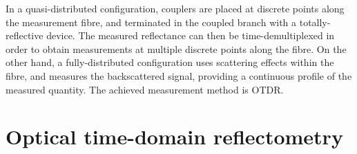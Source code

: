 \documentclass{standalone}
\begin{document}
In a quasi-distributed configuration, couplers are placed at discrete points along the measurement fibre, and terminated in the coupled branch with a totally-reflective device. The measured reflectance can then be time-demultiplexed in order to obtain measurements at multiple discrete points along the fibre. On the other hand, a fully-distributed configuration uses scattering effects within the fibre, and measures the backscattered signal, providing a continuous profile of the measured quantity. The achieved measurement method is OTDR.\\

\section{Optical time-domain reflectometry}
\end{document}
